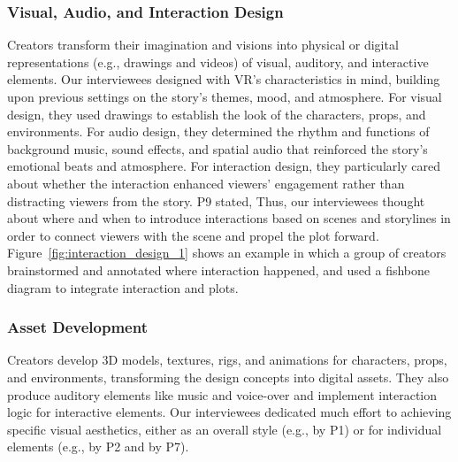 \subsubsection{Visual, Audio, and Interaction Design}
\label{sec:design}

Creators transform their imagination and visions into physical or digital representations (e.g., drawings and videos) of visual, auditory, and interactive elements. 
Our interviewees designed with VR's characteristics in mind, building upon previous settings on the story's themes, mood, and atmosphere.
For visual design, they used drawings to establish the look of the characters, props, and environments. 
For audio design, they determined the rhythm and functions of background music, sound effects, and spatial audio that reinforced the story's emotional beats and atmosphere.
For interaction design, they particularly cared about whether the interaction enhanced viewers' engagement rather than distracting viewers from the story. P9 stated,  Thus, our interviewees thought about where and when to introduce interactions based on scenes and storylines in order to connect viewers with the scene and propel the plot forward. Figure~\ref{fig:interaction_design_1} shows an example in which a group of creators brainstormed and annotated where interaction happened, and used a fishbone diagram to integrate interaction and plots.



\subsubsection{Asset Development}
\label{sec:asset_development}

Creators develop 3D models, textures, rigs, and animations for characters, props, and environments, transforming the design concepts into digital assets. They also produce auditory elements like music and voice-over and implement interaction logic for interactive elements.
Our interviewees dedicated much effort to achieving specific visual aesthetics, either as an overall style (e.g.,  by P1) or for individual elements (e.g.,  by P2 and  by P7).




